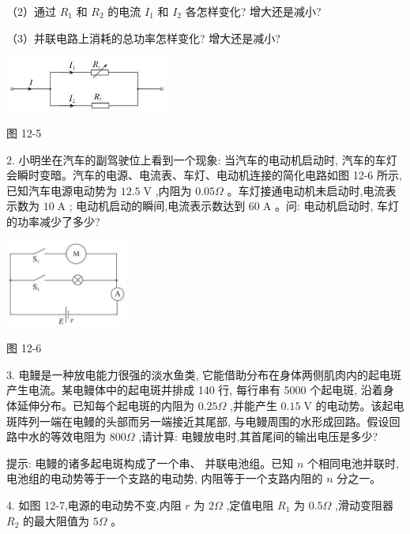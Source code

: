 \documentclass[10pt]{article}
\begin{document}
（2）通过 \({R}_{1}\) 和 \({R}_{2}\) 的电流 \({I}_{1}\) 和 \({I}_{2}\) 各怎样变化? 增大还是减小?

（3）并联电路上消耗的总功率怎样变化? 增大还是减小?

\begin{center}
\includegraphics[max width=0.4\textwidth]{images/01911d5f-8e38-70c0-b5b8-2b399bd115b6_106_674439.jpg}
\end{center}

图 12-5

2. 小明坐在汽车的副驾驶位上看到一个现象: 当汽车的电动机启动时, 汽车的车灯会瞬时变暗。汽车的电源、电流表、车灯、电动机连接的简化电路如图 12-6 所示, 已知汽车电源电动势为 \({12.5}\mathrm{\;V}\) ,内阻为 \({0.05\Omega }\) 。车灯接通电动机未启动时,电流表示数为 \({10}\mathrm{\;A}\) ; 电动机启动的瞬间,电流表示数达到 \({60}\mathrm{\;A}\) 。问: 电动机启动时, 车灯的功率减少了多少?

\begin{center}
\includegraphics[max width=0.3\textwidth]{images/01911d5f-8e38-70c0-b5b8-2b399bd115b6_106_955246.jpg}
\end{center}

图 12-6

3. 电鳗是一种放电能力很强的淡水鱼类, 它能借助分布在身体两侧肌肉内的起电斑产生电流。某电鳗体中的起电斑并排成 140 行, 每行串有 5000 个起电斑, 沿着身体延伸分布。已知每个起电斑的内阻为 \({0.25\Omega }\) ,并能产生 \({0.15}\mathrm{\;V}\) 的电动势。该起电斑阵列一端在电鳗的头部而另一端接近其尾部, 与电鳗周围的水形成回路。假设回路中水的等效电阻为 \({800\Omega }\) ,请计算: 电鳗放电时,其首尾间的输出电压是多少?

提示: 电鳗的诸多起电斑构成了一个串、 并联电池组。已知 \(n\) 个相同电池并联时,电池组的电动势等于一个支路的电动势, 内阻等于一个支路内阻的 \(n\) 分之一。

4. 如图 12-7,电源的电动势不变,内阻 \(r\) 为 \({2\Omega }\) ,定值电阻 \({R}_{1}\) 为 \({0.5\Omega }\) ,滑动变阻器 \({R}_{2}\) 的最大阻值为 \({5\Omega }\) 。
\end{document}
